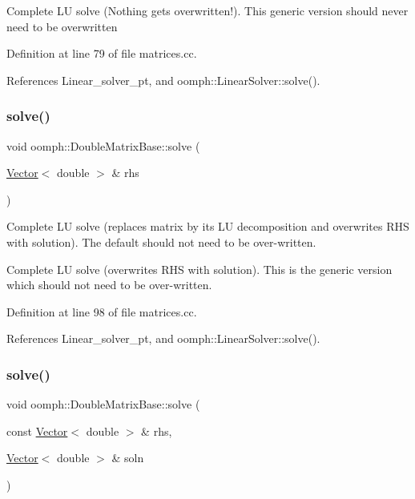 Complete LU solve (Nothing gets overwritten!). This generic version should never need to be overwritten 

Definition at line 79 of file matrices.\+cc.



References Linear\+\_\+solver\+\_\+pt, and oomph\+::\+Linear\+Solver\+::solve().

\mbox{\label{classoomph_1_1DoubleMatrixBase_ae9098f3e129833a6b1cb5fe6ebdd9835}} 
\subsubsection{\texorpdfstring{solve()}{solve()}\hspace{0.1cm}{\footnotesize\ttfamily [3/4]}}
{\footnotesize\ttfamily void oomph\+::\+Double\+Matrix\+Base\+::solve (\begin{DoxyParamCaption}\item[{\hyperlink{classoomph_1_1Vector}{Vector}$<$ double $>$ \&}]{rhs }\end{DoxyParamCaption})}



Complete LU solve (replaces matrix by its LU decomposition and overwrites R\+HS with solution). The default should not need to be over-\/written. 

Complete LU solve (overwrites R\+HS with solution). This is the generic version which should not need to be over-\/written. 

Definition at line 98 of file matrices.\+cc.



References Linear\+\_\+solver\+\_\+pt, and oomph\+::\+Linear\+Solver\+::solve().

\mbox{\label{classoomph_1_1DoubleMatrixBase_a8d9fb5fddec05a0b6e35cff23c79255c}} 
\subsubsection{\texorpdfstring{solve()}{solve()}\hspace{0.1cm}{\footnotesize\ttfamily [4/4]}}
{\footnotesize\ttfamily void oomph\+::\+Double\+Matrix\+Base\+::solve (\begin{DoxyParamCaption}\item[{const \hyperlink{classoomph_1_1Vector}{Vector}$<$ double $>$ \&}]{rhs,  }\item[{\hyperlink{classoomph_1_1Vector}{Vector}$<$ double $>$ \&}]{soln }\end{DoxyParamCaption})}



